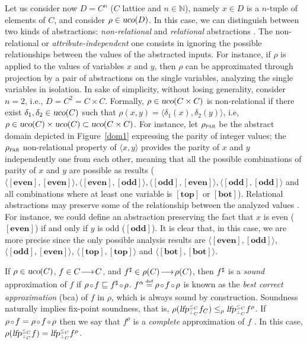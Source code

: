 \documentclass[prodmode,acmtocl]{acmsmall}
\def\uco{\ensuremath{\rho}\xspace}
\def\ucos{\ensuremath{\mbox{\sl uco}}\xspace}
\def\defi{\mbox{\raisebox{0ex}[1ex][1ex]{$\stackrel{\mbox{\tiny
def}}{\; =\;}$}}}
\def\ok#1{\mbox{\raisebox{0ex}[1ex][1ex]{$#1$}}}
\def\comp{\mathrel{\hbox{\footnotesize${}\!{\circ}\!{}$\normalsize}}}
\def\rarr#1{\mbox{\raisebox{0ex}[1ex][1ex]{$
  \mathrel{\mathop{
\hspace*{1pt}\longrightarrow\hspace*{1pt}}\limits^{\,_{\mbox{\tiny 
\hspace*{-2.2pt}#1}}}}$}}}
\def\tuple#1{\langle #1 \rangle}
\newcommand{\lgfp}[3]{\mbox{\sl #1}^{\mbox{\tiny {$#2$}}}_{\mbox{\tiny
{$#3$}}}}
\newcommand{\0}{\mbox{\bf 0}}
\def\ok#1{\mbox{\raisebox{0ex}[1ex][1ex]{$#1$}}}
\def\NATURALS{\mathbb{N}}
\def\PARDOM{\ensuremath{\uco_{\textsc{par}}}\xspace}
\def\EVEN{\ABSVAL{even}}
\def\ODD{\ABSVAL{odd}}
\def\TOP{\ABSVAL{top}}
\def\BOT{\ABSVAL{bot}}
\newcommand{\ABSVAL}[1]{\left[\mathbf{#1}\right]}
\begin{document}
Let us consider now $D=C^n$ ($C$ lattice and $n\in\NATURALS$), namely
$x\in D$ is a $n$-tuple of elements of $C$, and consider
$\uco\in\ucos(D)$.  In this case, we can distinguish between two kinds
of abstractions:\label{rel-nonrel} \emph{non-relational} and
\emph{relational} abstractions \cite{C01-Dag,CC79}.  The
non-relational or \emph{attribute-independent} one \cite[Example
  6.2.0.2]{CC79} consists in ignoring the possible relationships
between the values of the abstracted inputs.  For instance, if $\uco$
is applied to the values of variables $x$ and $y$, then $\uco$ can be
approximated through projection by a pair of abstractions on the
single variables, analyzing the single variables in isolation.  In
sake of simplicity, without losing generality, consider $n=2$, i.e.,
$D=C^2=C\times C$.  Formally, $\uco\in\ucos(C\times C)$ is
non-relational if there exist $\delta_1,\delta_2\in\ucos(C)$ such that
$\uco(x,y)=\tuple{\delta_1(x),\delta_2(y)}$, i.e,
$\uco\in\ucos(C)\times\ucos(C)\subset\ucos(C\times C)$. For instance,
let $\PARDOM$ be the abstract domain depicted in Figure~\ref{dom1}
expressing the parity of integer values; the $\PARDOM$ non-relational
property of $\tuple{x,y}$ provides the parity of $x$ and $y$
independently one from each other, meaning that all the possible
combinations of parity of $x$ and $y$ are possible as results
($\tuple{\EVEN,\EVEN},\tuple{\EVEN,\ODD},\tuple{\ODD,\EVEN},\tuple{\ODD,\ODD}$
and all combinations where at least one variable is $\TOP$ or $\BOT$).
Relational abstractions may preserve some of the relationship between
the analyzed values \cite{C01-Dag}. For instance, we could define an
abstraction preserving the fact that $x$ is even ($\EVEN$) if and only
if $y$ is odd ($\ODD$). It is clear that, in this case, we are more
precise since the only possible analysis results are
$\tuple{\EVEN,\ODD}$, $\tuple{\ODD,\EVEN}$, $\tuple{\TOP,\TOP}$ and
$\tuple{\BOT,\BOT}$.

If $\uco\in\ucos(C)$, $\ok{f\in C\rarr{} C}$, and $\ok{f^\sharp\in
  \uco(C)\rarr{} \uco(C)}$, then $\ok{f^\sharp}$ is a {\em sound\/}
approximation of $f$ if $\ok{\uco\comp f \sqsubseteq
  f^\sharp\comp\uco}$.  $\ok{f^{\alpha}\defi\uco\comp f\comp\uco}$ is
known as the {\em best correct approximation\/} (bca) of $f$ in
$\uco$, which is always sound by construction.  Soundness naturally
implies fix-point soundness, that is,
$\ok{\uco(\lgfp{lfp}{\leq_{\mbox{\tiny $C$}}}{\bot_{\mbox{\tiny $C$}}}
  f_C) \leq_{\uco} \lgfp{lfp}{\leq_{\mbox{\tiny
        $C$}}}{\bot_{\mbox{\tiny $C$}}} f^\uco}$. If $\uco\comp f =
\uco\comp f\comp\uco$ then we say that $f^\uco$ is a {\em complete\/}
approximation of $f$ \cite{CC79,GRSjacm}.  In this case,
$\ok{\uco(\lgfp{lfp}{\leq_{\mbox{\tiny $C$}}}{\bot_{\mbox{\tiny $C$}}}
  f) = \lgfp{lfp}{\leq_{\mbox{\tiny $C$}}}{\bot_{\mbox{\tiny $C$}}}
  f^\uco}$.
\end{document}
